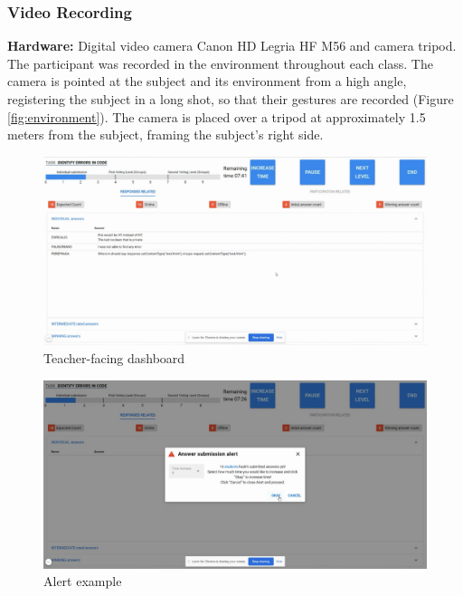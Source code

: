 \subsubsection{Video Recording}
\textbf{Hardware:} Digital video camera Canon HD Legria HF M56 and camera tripod.
The participant was recorded in the environment throughout each class. The camera is pointed at the subject and its environment from a high angle, registering the subject in a long shot, so that their gestures are recorded (Figure \ref{fig:environment}). The camera is placed over a tripod at approximately 1.5 meters from the subject, framing the subject's right side.
\begin{figure}[!h]
    \includegraphics[clip,width=\columnwidth]{Figures/pyramidapp8.png}%
\caption{Teacher-facing dashboard}
\label{fig:P8}
\end{figure}
\begin{figure}[!h]
    \includegraphics[clip,width=\columnwidth]{Figures/pyramidapp9.png}%
\caption{Alert example}
\label{fig:P9}
\end{figure}
